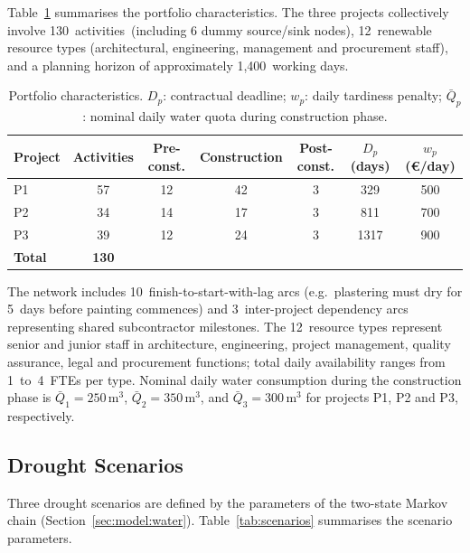 \documentclass[12pt,a4paper]{article}
\newcommand{\Qbar}{\bar{Q}}
\begin{document}
Table~\ref{tab:portfolio} summarises the portfolio characteristics.  The three
projects collectively involve 130~activities~(including 6 dummy
source/sink nodes), 12~renewable resource types (architectural, engineering,
management and procurement staff), and a planning horizon of approximately
1,400~working days.

\begin{table}[h]
\caption{Portfolio characteristics. $D_p$: contractual deadline; $w_p$: daily
tardiness penalty; $\Qbar_p$: nominal daily water quota during construction phase.}
\label{tab:portfolio}
\centering
\begin{tabular}{lcccccc}
\toprule
Project & Activities & Pre-const. & Construction & Post-const. & $D_p$ (days) &
$w_p$ (\euro{}/day) \\
\midrule
P1 & 57 & 12 & 42 & 3 & 329 & 500 \\
P2 & 34 & 14 & 17 & 3 & 811 & 700 \\
P3 & 39 & 12 & 24 & 3 & 1317 & 900 \\
\midrule
\textbf{Total} & \textbf{130} & & & & & \\
\bottomrule
\end{tabular}
\end{table}

The network includes 10~finish-to-start-with-lag arcs (e.g.\ plastering must dry
for 5~days before painting commences) and 3~inter-project dependency arcs
representing shared subcontractor milestones.  The 12~resource types represent
senior and junior staff in architecture, engineering, project management, quality
assurance, legal and procurement functions; total daily availability ranges from
1~to~4~FTEs per type.  Nominal daily water consumption during the construction phase
is $\Qbar_1 = 250$\,m$^3$, $\Qbar_2 = 350$\,m$^3$, and $\Qbar_3 = 300$\,m$^3$ for
projects P1, P2 and P3, respectively.

\subsection{Drought Scenarios}
\label{sec:case:scenarios}

Three drought scenarios are defined by the parameters of the two-state Markov chain
(Section~\ref{sec:model:water}).  Table~\ref{tab:scenarios} summarises the
scenario parameters.
\end{document}
